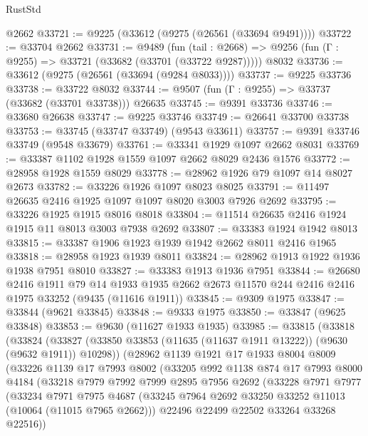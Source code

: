 \begin{lexlean}{RustStd}
\begin{coremodule}
    @2662
@33721 := @9225 (@33612 (@9275 (@26561 (@33694 @9491))))
@33722 := @33704 @2662
@33731 := @9489
    (fun (tail : @2668) => @9256 (fun (Γ : @9255) => @33721 (@33682 (@33701 (@33722 @9287)))))
    @8032
@33736 := @33612 (@9275 (@26561 (@33694 (@9284 @8033))))
@33737 := @9225 @33736
@33738 := @33722 @8032
@33744 := @9507 (fun (Γ : @9255) => @33737 (@33682 (@33701 @33738))) @26635
@33745 := @9391 @33736
@33746 := @33680 @26638
@33747 := @9225 @33746
@33749 := @26641 @33700 @33738
@33753 := @33745 (@33747 @33749) (@9543 @33611)
@33757 := @9391 @33746 @33749 (@9548 @33679)
@33761 := @33341 @1929 @1097 @2662 @8031
@33769 := @33387 @1102 @1928 @1559 @1097 @2662 @8029 @2436 @1576
@33772 := @28958 @1928 @1559 @8029
@33778 := @28962 @1926 @79 @1097 @14 @8027 @2673
@33782 := @33226 @1926 @1097 @8023 @8025
@33791 := @11497 @26635 @2416 @1925 @1097 @1097 @8020 @3003 @7926 @2692
@33795 := @33226 @1925 @1915 @8016 @8018
@33804 := @11514 @26635 @2416 @1924 @1915 @11 @8013 @3003 @7938 @2692
@33807 := @33383 @1924 @1942 @8013
@33815 := @33387 @1906 @1923 @1939 @1942 @2662 @8011 @2416 @1965
@33818 := @28958 @1923 @1939 @8011
@33824 := @28962 @1913 @1922 @1936 @1938 @7951 @8010
@33827 := @33383 @1913 @1936 @7951
@33844 := @26680
    @2416
    @1911
    @79
    @14
    @1933
    @1935
    @2662
    @2673
    @11570
    @244
    @2416
    @2416
    @1975
    @33252
    (@9435 (@11616 @1911))
@33845 := @9309 @1975
@33847 := @33844 (@9621 @33845)
@33848 := @9333 @1975
@33850 := @33847 (@9625 @33848)
@33853 := @9630 (@11627 @1933 @1935)
@33985 := @33815
    (@33818
      (@33824
        (@33827 (@33850 @33853 (@11635 (@11637 @1911 @13222)) (@9630 (@9632 @1911)) @10298))
        (@28962
          @1139
          @1921
          @17
          @1933
          @8004
          @8009
          (@33226
            @1139
            @17
            @7993
            @8002
            (@33205
              @992
              @1138
              @874
              @17
              @7993
              @8000
              @4184
              (@33218
                @7979
                @7992
                @7999
                @2895
                @7956
                @2692
                (@33228
                  @7971
                  @7977
                  (@33234
                    @7971
                    @7975
                    @4687
                    (@33245 @7964 @2692 @33250 @33252 @11013 (@10064 (@11015 @7965 @2662)))
                    @22496
                    @22499
                    @22502
                    @33264
                    @33268
                    @22516))

\end{coremodule}
\end{lexlean}
